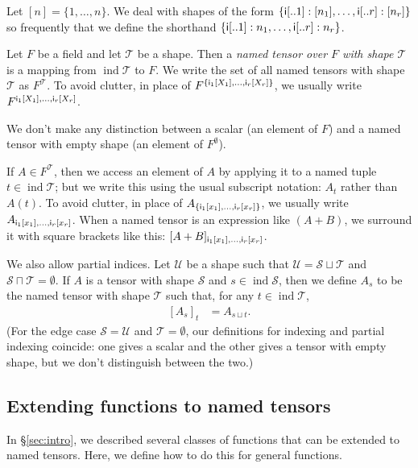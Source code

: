 \documentclass{article}
\newcommand{\tuple}[1]{\{#1\}}
\DeclareMathOperator{\tupleshape}{ind}
\begin{document}
Let $[n] = \{1, \ldots, n\}$. We deal with shapes of the form $\tuple{\nset{i}{..1}: [n_1], \ldots, \nset{i}{..r}: [n_r]}$ so frequently that we define the shorthand $\tuple{\nset{i}{..1}: n_1, \ldots, \nset{i}{..r}: n_r}$.

Let $F$ be a field and let $\mathcal{T}$ be a shape. Then a \emph{named tensor over $F$ with shape $\mathcal{T}$} is a mapping from $\tupleshape \mathcal{T}$ to $F$. We write the set of all named tensors with shape $\mathcal{T}$ as $F^{\mathcal{T}}$. To avoid clutter, in place of $F^{\tuple{\nset{i\sub{1}}{X_1}, \ldots, \nset{i\sub{r}}{X_r}}}$, we usually write $F^{\mathsf{i_\text{$1$}}[X_1], \ldots, \mathsf{i_\text{$r$}}[X_r]}$.

We don't make any distinction between a scalar (an element of $F$) and a named tensor with empty shape (an element of $F^\emptyset$).

If $A \in F^{\mathcal{T}}$, then we access an element of $A$ by applying it to a named tuple $t \in \tupleshape\mathcal{T}$; but we write this using the usual subscript notation: $A_t$ rather than $A(t)$. To avoid clutter, in place of $A_{\tuple{\nidx{i\sub{1}}{x_1}, \ldots, \nidx{i\sub{r}}{x_r}}}$, we usually write $A_{\mathsf{i_\text{$1$}}[x_1], \ldots, \mathsf{i_\text{$r$}}[x_r]}$. When a named tensor is an expression like $(A+B)$, we surround it with square brackets like this: $[A+B]_{\mathsf{i_\text{$1$}}[x_1], \ldots, \mathsf{i_\text{$r$}}[x_r]}$.

We also allow partial indices. Let $\mathcal{U}$ be a shape such that $\mathcal{U} = \mathcal{S} \sqcup \mathcal{T}$ and $\mathcal{S} \sqcap \mathcal{T} = \emptyset$.
If $A$ is a tensor with shape $\mathcal{S}$ and $s \in \tupleshape \mathcal{S}$, then we define $A_s$ to be the named tensor with shape $\mathcal{T}$ such that, for any $t \in \tupleshape \mathcal{T}$,
\begin{align*}
\left[A_s\right]_t &= A_{s \sqcup t}.
\end{align*}
(For the edge case $\mathcal{S} = \mathcal{U}$ and $\mathcal{T} = \emptyset$, our definitions for indexing and partial indexing coincide: one gives a scalar and the other gives a tensor with empty shape, but we don't distinguish between the two.)

\subsection{Extending functions to named tensors}
\label{sec:tensorfunctions}

In \S\ref{sec:intro}, we described several classes of functions that can be extended to named tensors. Here, we define how to do this for general functions.
\end{document}

